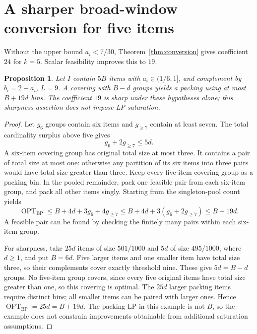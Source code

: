 \documentclass[11pt,a4paper]{article}
\newtheorem{proposition}[theorem]{Proposition}
\theoremstyle{definition}
\theoremstyle{remark}
\newcommand{\BP}{\mathrm{BP}}
\newcommand{\OPT}{\operatorname{OPT}}
\begin{document}
\section{A sharper broad-window conversion for five items}\label{app:nineteen}
Without the upper bound $a_i<7/30$, Theorem~\ref{thm:conversion} gives coefficient $24$ for $k=5$. Scalar feasibility improves this to $19$.
\begin{proposition}\label{prop:nineteen}
Let $I$ contain $5B$ items with $a_i\in(1/6,1]$, and complement by $b_i=2-a_i$, $L=9$. A covering with $B-d$ groups yields a packing using at most $B+19d$ bins. The coefficient $19$ is sharp under these hypotheses alone; this sharpness assertion does not impose LP saturation.
\end{proposition}
\begin{proof}
Let $g_6$ groups contain six items and $g_{\ge7}$ contain at least seven. The total cardinality surplus above five gives
\[
 g_6+2g_{\ge7}\le5d.
\]
A six-item covering group has original total size at most three. It contains a pair of total size at most one: otherwise any partition of its six items into three pairs would have total size greater than three. Keep every five-item covering group as a packing bin. In the pooled remainder, pack one feasible pair from each six-item group, and pack all other items singly. Starting from the singleton-pool count yields
\[
 \OPT_{\BP}\le B+4d+3g_6+4g_{\ge7}
 \le B+4d+3(g_6+2g_{\ge7})\le B+19d.
\]
A feasible pair can be found by checking the finitely many pairs within each six-item group.

For sharpness, take $25d$ items of size $501/1000$ and $5d$ of size $495/1000$, where $d\ge1$, and put $B=6d$. Five larger items and one smaller item have total size three, so their complements cover exactly threshold nine. These give $5d=B-d$ groups. No five-item group covers, since every five original items have total size greater than one, so this covering is optimal. The $25d$ larger packing items require distinct bins; all smaller items can be paired with larger ones. Hence $\OPT_{\BP}=25d=B+19d$. The packing LP in this example is not $B$, so the example does not constrain improvements obtainable from additional saturation assumptions.
\end{proof}



\end{document}
